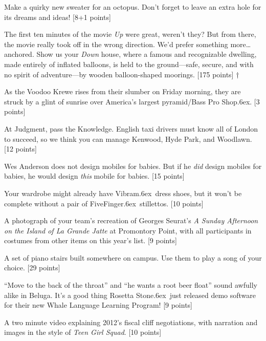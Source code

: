 \documentclass{book}
\def\tr{\raise.6ex\hbox{\scriptsize \textregistered}}
\begin{document}
\begin{list}{}{}
\item Make a quirky new sweater for an octopus.  Don't forget to leave an extra hole for its dreams and ideas! [8+1 points]

\item The first ten minutes of the movie \emph{Up} were great, weren't they? But from there, the movie really took off in the wrong direction. We'd prefer something more\ldots anchored. Show us your \emph{Down} house, where a famous and recognizable dwelling, made entirely of inflated balloons,  is held to the ground---safe, secure, and with no spirit of adventure---by wooden balloon-shaped moorings. [175 points] $\dagger$

\item As the Voodoo Krewe rises from their slumber on Friday morning, they are struck by a glint of sunrise over America's largest pyramid/Bass Pro Shop\tr. [3 points] 

\item At Judgment, pass the Knowledge.  English taxi drivers must know all of London to succeed, so we think you can manage Kenwood, Hyde Park, and Woodlawn.  [12 points]

\item Wes Anderson does not design mobiles for babies.  But if he \emph{did} design mobiles for babies, he would design \emph{this} mobile for babies. [15 points]

\item Your wardrobe might already have Vibram\tr\ dress shoes, but it won't be complete without a pair of FiveFinger\tr\ stillettos. [10 points]

\item A photograph of your team's recreation of Georges Seurat's \emph{A Sunday Afternoon on the Island of La Grande Jatte} at Promontory Point, with all participants in costumes from other items on this year's list. [9 points]

\item A set of piano stairs built somewhere on campus.  Use them to play a song of your choice. [29 points]

\item ``Move to the back of the throat'' and ``he wants a root beer float'' sound awfully alike in Beluga.  It's a good thing Rosetta Stone\tr\ just released demo software for their new Whale Language Learning Program! [9 points]

\item A two minute video explaining 2012's fiscal cliff negotiations, with narration and images in the style of \emph{Teen Girl Squad}. [10 points]


\end{list}
\end{document}
